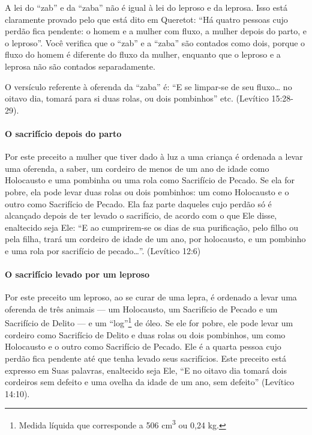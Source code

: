 A lei do ``zab'' e da ``zaba'' não é igual à lei do leproso e da
leprosa. Isso está claramente provado pelo que está dito em Queretot:
``Há quatro pessoas cujo perdão fica pendente: o homem e a mulher com
fluxo, a mulher depois do parto, e o leproso''. Você verifica que o
``zab'' e a ``zaba'' são contados como dois, porque o fluxo do homem é
diferente do fluxo da mulher, enquanto que o leproso e a leprosa não
são contados separadamente.

O versículo referente à oferenda da ``zaba'' é: ``E se limpar-se de seu
fluxo\ldots{} no oitavo dia, tomará para si duas rolas, ou dois pombinhos''
etc. (Levítico 15:28-29).

\paragraph{O sacrifício depois do parto}

Por este preceito a mulher que tiver dado à luz a uma criança é
ordenada a levar uma oferenda, a saber, um cordeiro de menos de um ano
de idade como Holocausto e uma pombinha ou uma rola como Sacrifício de
Pecado. Se ela for pobre, ela pode levar duas rolas ou dois pombinhos:
um como Holocausto e o outro como Sacrifício de Pecado. Ela faz parte
daqueles cujo perdão só é alcançado depois de ter levado o sacrifício,
de acordo com o que Ele disse, enaltecido seja Ele: ``E ao cumprirem-se
os dias de sua purificação, pelo filho ou pela filha, trará um cordeiro
de idade de um ano, por holocausto, e um pombinho e uma rola por
sacrifício de pecado\ldots{}''. (Levítico 12:6)

\paragraph{O sacrifício levado por um leproso}

Por este preceito um leproso, ao se curar de uma lepra, é ordenado a
levar uma oferenda de três animais --- um Holocausto, um Sacrifício de
Pecado e um Sacrifício de Delito --- e um ``log''\footnote{Medida líquida que corresponde a 506 cm\textsuperscript{3} ou 0,24 kg.}
de óleo. Se ele for pobre, ele pode levar um cordeiro como Sacrifício de
Delito e duas rolas ou dois pombinhos, um como Holocausto e o outro como
Sacrifício de Pecado. Ele é a quarta pessoa cujo perdão fica pendente
até que tenha levado seus sacrifícios. Este preceito está expresso em
Suas palavras, enaltecido seja Ele, ``E no oitavo dia tomará dois
cordeiros sem defeito e uma ovelha da idade de um ano, sem defeito''
(Levítico 14:10).

